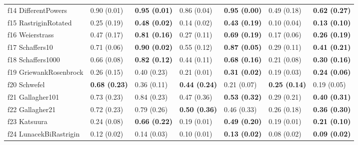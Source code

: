 \begin{table}
\begin{tabular}{lllllll}
f14 DifferentPowers & 0.90 (0.01) & \textbf{0.95 (0.01)} & 0.86 (0.04) & \textbf{0.95 (0.00)} & 0.49 (0.18) & \textbf{0.62 (0.27)} \\
f15 RastriginRotated & 0.25 (0.19) & \textbf{0.48 (0.02)} & 0.14 (0.02) & \textbf{0.43 (0.19)} & 0.10 (0.04) & \textbf{0.13 (0.10)} \\
f16 Weierstrass & 0.47 (0.17) & \textbf{0.81 (0.16)} & 0.27 (0.11) & \textbf{0.69 (0.19)} & 0.17 (0.06) & \textbf{0.26 (0.19)} \\
f17 Schaffers10 & 0.71 (0.06) & \textbf{0.90 (0.02)} & 0.55 (0.12) & \textbf{0.87 (0.05)} & 0.29 (0.11) & \textbf{0.41 (0.21)} \\
f18 Schaffers1000 & 0.66 (0.08) & \textbf{0.82 (0.12)} & 0.44 (0.11) & \textbf{0.68 (0.16)} & 0.21 (0.08) & \textbf{0.30 (0.16)} \\
f19 GriewankRosenbrock & 0.26 (0.15) & 0.40 (0.23) & 0.21 (0.01) & \textbf{0.31 (0.02)} & 0.19 (0.03) & \textbf{0.24 (0.06)} \\
f20 Schwefel & \textbf{0.68 (0.23)} & 0.36 (0.11) & \textbf{0.44 (0.24)} & 0.21 (0.07) & \textbf{0.25 (0.14)} & 0.19 (0.05) \\
f21 Gallagher101 & 0.73 (0.23) & 0.84 (0.23) & 0.47 (0.36) & \textbf{0.53 (0.32)} & 0.29 (0.21) & \textbf{0.40 (0.31)} \\
f22 Gallagher21 & 0.72 (0.23) & 0.79 (0.26) & \textbf{0.50 (0.36)} & 0.46 (0.33) & 0.26 (0.18) & \textbf{0.36 (0.30)} \\
f23 Katsuura & 0.24 (0.08) & \textbf{0.66 (0.22)} & 0.19 (0.01) & \textbf{0.49 (0.20)} & 0.19 (0.01) & \textbf{0.21 (0.10)} \\
f24 LunacekBiRastrigin & 0.12 (0.02) & 0.14 (0.03) & 0.10 (0.01) & \textbf{0.13 (0.02)} & 0.08 (0.02) & \textbf{0.09 (0.02)} \\
\bottomrule
\end{tabular}
\end{table}
